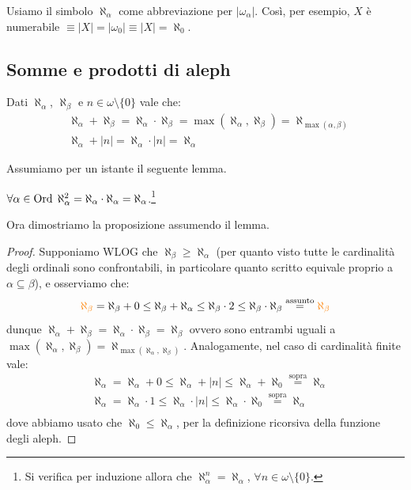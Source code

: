 \begin{notation}[$|\omega_\alpha| = \aleph_\alpha$]
	Usiamo il simbolo $\aleph_\alpha$ come abbreviazione per $|\omega_\alpha|$. Così, per esempio, $X$ è numerabile $\equiv |X| = |\omega_0| \equiv |X| = \aleph_0$.
\end{notation}

\subsection{Somme e prodotti di aleph}

\begin{proposition}
	Dati $\aleph_\alpha$, $\aleph_\beta$ e $n \in \omega\setminus\{0\}$ vale che:
	\begin{align*}
		& \aleph_\alpha + \aleph_\beta = \aleph_\alpha \cdot\aleph_\beta = \max(\aleph_\alpha,\aleph_\beta) = \aleph_{\max(\alpha,\beta)} \\
		& \aleph_\alpha + |n| = \aleph_\alpha \cdot |n| = \aleph_\alpha
	\end{align*}
\end{proposition}

Assumiamo per un istante il seguente lemma.

\begin{lemma}[$\aleph_\alpha \cdot \aleph_\alpha = \aleph_\alpha$]
	$\forall \alpha \in \operatorname{Ord} \; \aleph_{\alpha}^2 = \aleph_\alpha \cdot \aleph_\alpha = \aleph_\alpha$.\footnote{Si verifica per induzione allora che $\aleph_\alpha^n = \aleph_\alpha$, $\forall n \in \omega\setminus\{0\}$.}
\end{lemma}

Ora dimostriamo la proposizione assumendo il lemma.

\begin{proof}
	Supponiamo WLOG che $\aleph_\beta \geq \aleph_\alpha$ (per quanto visto tutte le cardinalità degli ordinali sono confrontabili, in particolare quanto scritto equivale proprio a $\alpha \subseteq \beta$), e osserviamo che:
	\[ \textcolor{orange}{\aleph_\beta} = \aleph_\beta + 0 \leq \aleph_\beta + \aleph_\alpha \leq \aleph_\beta \cdot 2 \leq \aleph_\beta \cdot \aleph_\beta \overset{\text{assunto}}{=} \textcolor{orange}{\aleph_\beta}
		\]
	dunque $\aleph_\alpha + \aleph_\beta = \aleph_\alpha \cdot\aleph_\beta = \aleph_\beta$ ovvero sono entrambi uguali a $ \max(\aleph_\alpha,\aleph_\beta) = \aleph_{\max(\aleph_\alpha,\aleph_\beta)}$.
	Analogamente, nel caso di cardinalità finite vale:
	\begin{align*}
		&\aleph_\alpha = \aleph_\alpha + 0 \leq \aleph_\alpha + |n| \leq \aleph_\alpha + \aleph_0 \overset{\text{sopra}}{=} \aleph_\alpha \\
		&\aleph_\alpha = \aleph_\alpha \cdot 1 \leq \aleph_\alpha \cdot |n| \leq \aleph_\alpha \cdot \aleph_0 \overset{\text{sopra}}{=} \aleph_\alpha \\
	\end{align*}
	dove abbiamo usato che $\aleph_0 \leq \aleph_\alpha$, per la definizione ricorsiva della funzione degli aleph.
\end{proof}


